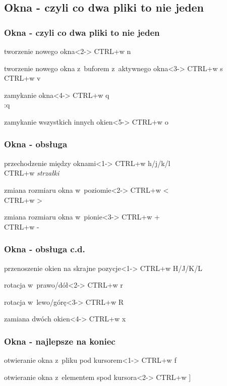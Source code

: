 \documentclass[10pt]{beamer}
\begin{document}
\subsection{Okna - czyli co dwa pliki to nie jeden}
\begin{frame}
	\frametitle{Okna - czyli co dwa pliki to nie jeden}
	\begin{block}{tworzenie nowego okna}<2->
		CTRL+w n
	\end{block}
	\begin{block}{tworzenie nowego okna z~buforem z~aktywnego okna}<3->
		CTRL+w s\\
		CTRL+w v
	\end{block}
	\begin{block}{zamykanie okna}<4->
		CTRL+w q\\
		:q
	\end{block}
	\begin{block}{zamykanie wszystkich innych okien}<5->
		CTRL+w o
	\end{block}
\end{frame}
\begin{frame}
	\frametitle{Okna - obsługa}
	\begin{block}{przechodzenie między oknami}<1->
		CTRL+w h/j/k/l\\
		CTRL+w \textit{strzałki}
	\end{block}
	\begin{block}{zmiana rozmiaru okna w~poziomie}<2->
		CTRL+w \textless\\
		CTRL+w \textgreater
	\end{block}
	\begin{block}{zmiana rozmiaru okna w~pionie}<3->
		CTRL+w +\\
		CTRL+w -
	\end{block}
\end{frame}
\begin{frame}
	\frametitle{Okna - obsługa c.d.}
	\begin{block}{przenoszenie okien na skrajne pozycje}<1->
		CTRL+w H/J/K/L
	\end{block}
	\begin{block}{rotacja w~prawo/dół}<2->
		CTRL+w r
	\end{block}
	\begin{block}{rotacja w~lewo/górę}<3->
		CTRL+w R
	\end{block}
	\begin{block}{zamiana dwóch okien}<4->
		CTRL+w x
	\end{block}
\end{frame}
\begin{frame}
	\frametitle{Okna - najlepsze na koniec}
	\begin{block}{otwieranie okna z~pliku pod kursorem}<1->
	CTRL+w f
	\end{block}
	\begin{block}{otwieranie okna z~elementem spod kursora}<2->
	CTRL+w ]
	\end{block}
\end{frame}
\end{document}
